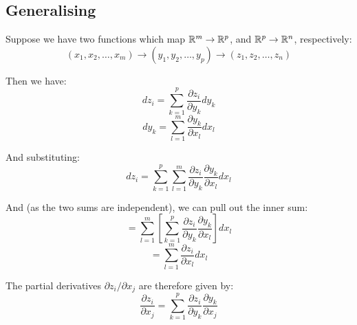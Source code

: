 \subsection{Generalising}
Suppose we have two functions which map $\mathbb{R}^m \to \mathbb{R}^p$, and $\mathbb{R}^p \to \mathbb{R}^n$, respectively:
\[
    (x_1, x_2, \ldots, x_m) \to (y_1, y_2, \ldots, y_p) \to (z_1, z_2, \ldots, z_n)
\]

Then we have:
\[
    d z_i = \sum_{k = 1}^{p} \frac{\partial z_i}{\partial y_k} dy_k
\]
\[
    dy_k = \sum_{l=1}^{m} \frac{\partial y_k}{\partial x_l} dx_l
\]

And substituting:
\[
    d z_i = \sum_{k=1}^{p} \sum_{l=1}^{m} \frac{\partial z_i}{\partial y_k} \frac{\partial y_k}{\partial x_l} dx_l
\]

And (as the two sums are independent), we can pull out the inner sum:
\[
    = \sum_{l=1}^{m} \left[\sum_{k=1}^{p} \frac{\partial z_i}{\partial y_k} \frac{\partial y_k}{\partial x_l}\right] dx_l
\]
\[
    = \sum_{l=1}^{m} \frac{\partial z_i}{\partial x_l} dx_l
\]

The partial derivatives $\partial z_i / \partial x_j$ are therefore given by:
\[
    \frac{\partial z_i}{\partial x_j} = \sum_{k=1}^{p} \frac{\partial z_i}{\partial y_k} \frac{\partial y_k}{\partial x_j}
\]

